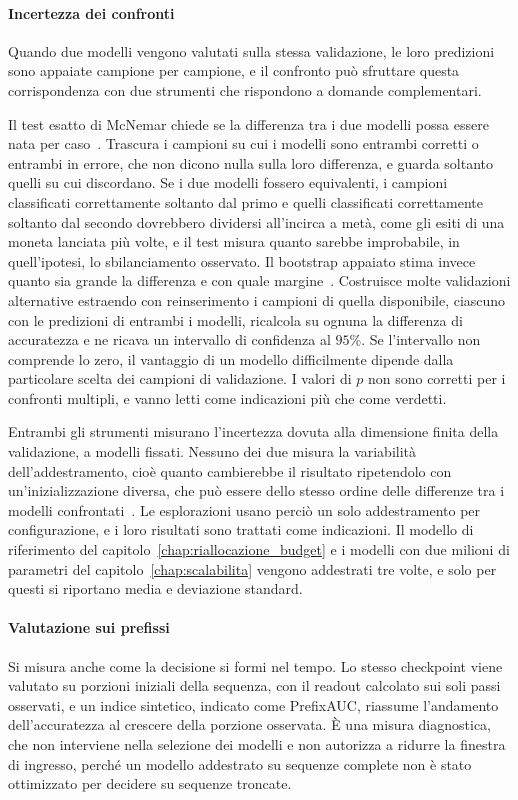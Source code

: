 \paragraph{Incertezza dei confronti}
Quando due modelli vengono valutati sulla stessa validazione, le loro predizioni sono appaiate campione per campione, e il confronto può sfruttare questa corrispondenza con due strumenti che rispondono a domande complementari.

Il test esatto di McNemar chiede se la differenza tra i due modelli possa essere nata per caso~\cite{mcnemar1947note,dietterich1998approximate}. Trascura i campioni su cui i modelli sono entrambi corretti o entrambi in errore, che non dicono nulla sulla loro differenza, e guarda soltanto quelli su cui discordano. Se i due modelli fossero equivalenti, i campioni classificati correttamente soltanto dal primo e quelli classificati correttamente soltanto dal secondo dovrebbero dividersi all'incirca a metà, come gli esiti di una moneta lanciata più volte, e il test misura quanto sarebbe improbabile, in quell'ipotesi, lo sbilanciamento osservato. Il bootstrap appaiato stima invece quanto sia grande la differenza e con quale margine~\cite{efron1993bootstrap}. Costruisce molte validazioni alternative estraendo con reinserimento i campioni di quella disponibile, ciascuno con le predizioni di entrambi i modelli, ricalcola su ognuna la differenza di accuratezza e ne ricava un intervallo di confidenza al $95\%$. Se l'intervallo non comprende lo zero, il vantaggio di un modello difficilmente dipende dalla particolare scelta dei campioni di validazione. I valori di $p$ non sono corretti per i confronti multipli, e vanno letti come indicazioni più che come verdetti.

Entrambi gli strumenti misurano l'incertezza dovuta alla dimensione finita della validazione, a modelli fissati. Nessuno dei due misura la variabilità dell'addestramento, cioè quanto cambierebbe il risultato ripetendolo con un'inizializzazione diversa, che può essere dello stesso ordine delle differenze tra i modelli confrontati~\cite{bouthillier2021accounting}. Le esplorazioni usano perciò un solo addestramento per configurazione, e i loro risultati sono trattati come indicazioni. Il modello di riferimento del capitolo~\ref{chap:riallocazione_budget} e i modelli con due milioni di parametri del capitolo~\ref{chap:scalabilita} vengono addestrati tre volte, e solo per questi si riportano media e deviazione standard.

\paragraph{Valutazione sui prefissi}
\label{subsec:prefissi}
Si misura anche come la decisione si formi nel tempo. Lo stesso checkpoint viene valutato su porzioni iniziali della sequenza, con il readout calcolato sui soli passi osservati, e un indice sintetico, indicato come PrefixAUC, riassume l'andamento dell'accuratezza al crescere della porzione osservata. È una misura diagnostica, che non interviene nella selezione dei modelli e non autorizza a ridurre la finestra di ingresso, perché un modello addestrato su sequenze complete non è stato ottimizzato per decidere su sequenze troncate.

